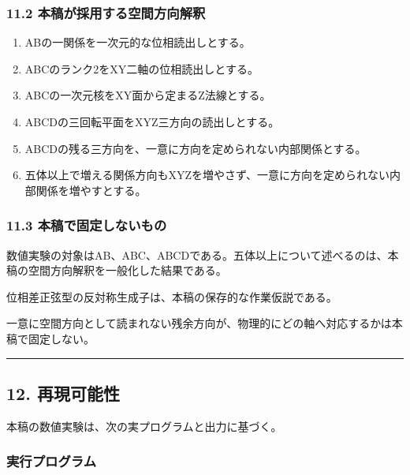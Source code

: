 \documentclass[
  10pt,
  a4paper,
]{article}
\providecommand{\tightlist}{%
  \setlength{\itemsep}{0pt}\setlength{\parskip}{0pt}}
\begin{document}
\subsubsection{11.2
本稿が採用する空間方向解釈}\label{ux672cux7a3fux304cux63a1ux7528ux3059ux308bux7a7aux9593ux65b9ux5411ux89e3ux91c8}

\begin{enumerate}
\def\labelenumi{\arabic{enumi}.}
\tightlist
\item
  ABの一関係を一次元的な位相読出しとする。
\item
  ABCのランク2をXY二軸の位相読出しとする。
\item
  ABCの一次元核をXY面から定まるZ法線とする。
\item
  ABCDの三回転平面をXYZ三方向の読出しとする。
\item
  ABCDの残る三方向を、一意に方向を定められない内部関係とする。
\item
  五体以上で増える関係方向もXYZを増やさず、一意に方向を定められない内部関係を増やすとする。
\end{enumerate}

\subsubsection{11.3
本稿で固定しないもの}\label{ux672cux7a3fux3067ux56faux5b9aux3057ux306aux3044ux3082ux306e}

数値実験の対象はAB、ABC、ABCDである。五体以上について述べるのは、本稿の空間方向解釈を一般化した結果である。

位相差正弦型の反対称生成子は、本稿の保存的な作業仮説である。

一意に空間方向として読まれない残余方向が、物理的にどの軸へ対応するかは本稿で固定しない。

\begin{center}\rule{0.5\linewidth}{0.5pt}\end{center}

\subsection{12. 再現可能性}\label{ux518dux73feux53efux80fdux6027}

本稿の数値実験は、次の実プログラムと出力に基づく。

\subsubsection{実行プログラム}\label{ux5b9fux884cux30d7ux30edux30b0ux30e9ux30e0}
\end{document}
